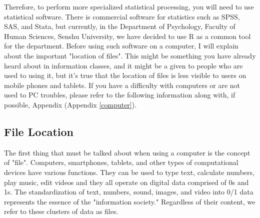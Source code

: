 \documentclass{ltjsbook}
\begin{document}
Therefore, to perform more specialized statistical processing, you will need to use statistical software. There is commercial software for statistics such as SPSS, SAS, and Stata, but currently, in the Department of Psychology, Faculty of Human Sciences, Senshu University, we have decided to use R as a common tool for the department. Before using such software on a computer, I will explain about the important "location of files". This might be something you have already heard about in information classes, and it might be a given to people who are used to using it, but it's true that the location of files is less visible to users on mobile phones and tablets. If you have a difficulty with computers or are not used to PC troubles, please refer to the following information along with, if possible, Appendix (Appendix \ref{computer}).

\subsection{File Location}
\label{filelocale}
The first thing that must be talked about when using a computer is the concept of "file".
Computers, smartphones, tablets, and other types of computational devices have various functions. They can be used to type text, calculate numbers, play music, edit videos and they all operate on digital data comprised of 0s and 1s. The standardization of text, numbers, sound, images, and video into 0/1 data represents the essence of the "information society." Regardless of their content, we refer to these clusters of data as files.
\end{document}
